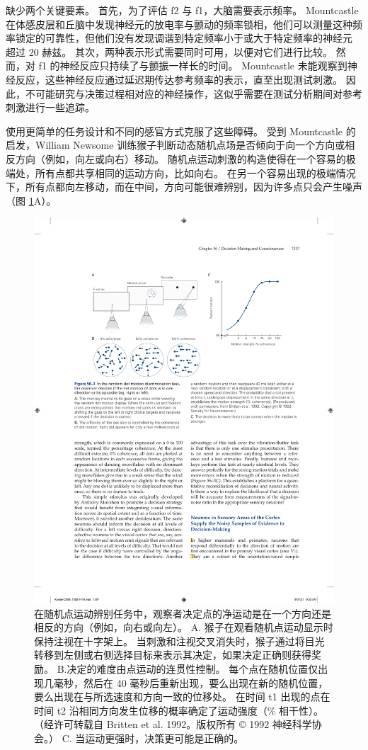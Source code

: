 缺少两个关键要素。 首先，为了评估 f2 与 f1，大脑需要表示频率。 Mountcastle 在体感皮层和丘脑中发现神经元的放电率与颤动的频率锁相，他们可以测量这种频率锁定的可靠性，但他们没有发现调谐到特定频率小于或大于特定频率的神经元 超过 20 赫兹。 其次，两种表示形式需要同时可用，以便对它们进行比较。 然而，对 f1 的神经反应只持续了与颤振一样长的时间。 Mountcastle 未能观察到神经反应，这些神经反应通过延迟期传达参考频率的表示，直至出现测试刺激。 因此，不可能研究与决策过程相对应的神经操作，这似乎需要在测试分析期间对参考刺激进行一些追踪。

使用更简单的任务设计和不同的感官方式克服了这些障碍。 受到 Mountcastle 的启发，William Newsome 训练猴子判断动态随机点场是否倾向于向一个方向或相反方向（例如，向左或向右）移动。 随机点运动刺激的构造使得在一个容易的极端处，所有点都共享相同的运动方向，比如向右。 在另一个容易出现的极端情况下，所有点都向左移动，而在中间，方向可能很难辨别，因为许多点只会产生噪声（图 \ref{fig:56_3}A）。

\begin{figure}[htbp]
	\centering
	\includegraphics[width=0.7\linewidth]{chap56/fig_56_3}
	\caption{在随机点运动辨别任务中，观察者决定点的净运动是在一个方向还是相反的方向（例如，向右或向左）。 A. 猴子在观看随机点运动显示时保持注视在十字架上。 当刺激和注视交叉消失时，猴子通过将目光转移到左侧或右侧选择目标来表示其决定，如果决定正确则获得奖励。 B.决定的难度由点运动的连贯性控制。 每个点在随机位置仅出现几毫秒，然后在 40 毫秒后重新出现，要么出现在新的随机位置，要么出现在与所选速度和方向一致的位移处。 在时间 t1 出现的点在时间 t2 沿相同方向发生位移的概率确定了运动强度（\% 相干性）。 （经许可转载自 Britten et al. 1992。版权所有 © 1992 神经科学协会。） C. 当运动更强时，决策更可能是正确的。}
	\label{fig:56_3}
\end{figure}

